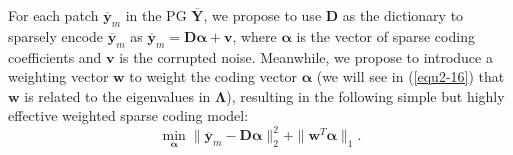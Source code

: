 For each patch $\bm{\overline{y}}_{m}$ in the PG $\bm{\overline{Y}}$, we propose to use $\bm{D}$ as the dictionary to sparsely encode $\bm{\overline{y}}_{m}$ as $\bm{\overline{y}}_{m}=\bm{D}\bm{\alpha}+\bm{v}$, where $\bm{\alpha}$ is the vector of sparse coding coefficients and $\bm{v}$ is the corrupted noise. Meanwhile, we propose to introduce a weighting vector $\bm{w}$ to weight the coding vector $\bm{\alpha}$ (we will see in (\ref{equ2-16}) that $\bm{w}$ is related to the eigenvalues in $\bm{\Lambda}$), resulting in the following simple but highly effective weighted sparse coding model:
\begin{equation}
\label{equ2-11}
\min_{\bm{\alpha}}{\|\bm{\overline{y}}_{m}-\bm{D}\bm{\alpha}\|_{2}^{2}+\|\bm{w}^{T}\bm{\alpha}\|_{1}}.
\end{equation}

